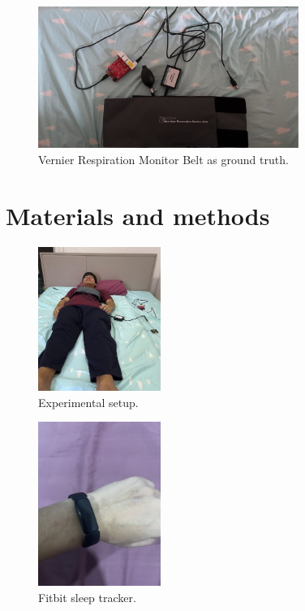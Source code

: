 \documentclass[10pt,letterpaper]{article}
\begin{document}
	\begin{figure}[htbp]
		\centerline{\includegraphics[width=85mm,scale=0.5]{VERNIERBELT.jpg}}
		\caption{Vernier Respiration Monitor Belt as ground truth.}
		\label{fig:VERNIERBELT}
	\end{figure}
	
	\section*{Materials and methods}
	
		\begin{figure}[htbp]
		\centerline{\includegraphics[width=40mm,scale=0.2]{SETUP05.jpg}}
		\caption{Experimental setup.}
		\label{fig:SETUP01}
	\end{figure}
	
	\begin{figure}[htbp]
		\centerline{\includegraphics[width=40mm,scale=0.2]{SETUP03.jpg}}
		\caption{Fitbit sleep tracker.}
		\label{fig:SETUP02}
	\end{figure}
	
\end{document}

